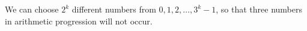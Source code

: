 We can choose $2^k$ different numbers from $0, 1, 2, \ldots, 3^k - 1$, so that three numbers in arithmetic progression will not occur.
